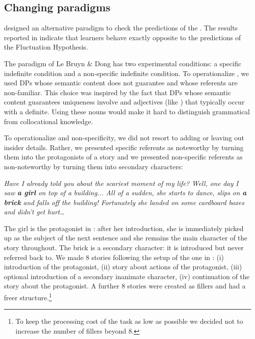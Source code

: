\documentclass[output=paper,
modfonts
]{langscibook}
\begin{document}
\subsection{Changing paradigms}

\citet{LeBruynDong2017S} designed an alternative paradigm to check the predictions of the . The results reported in \citet{LeBruynDong2017T} indicate that  learners behave exactly opposite to the predictions of the Fluctuation Hypothesis.

The paradigm of Le Bruyn \& Dong has two experimental conditions: a specific indefinite condition and a non-specific indefinite condition. To operationalize , we used DPs whose semantic content does not guarantee  and whose referents are non-familiar. This choice was inspired by the fact that DPs whose semantic content guarantees uniqueness involve  and adjectives (like ) that typically occur with a definite. Using these nouns would make it hard to distinguish grammatical from collocational knowledge.

To operationalize  and non-specificity, we did not resort to adding or leaving out insider details. Rather, we presented specific referents as noteworthy by turning them into the protagonists of a story and we presented non-specific referents as non-noteworthy by turning them into secondary characters:

\ea\label{ex:lebruyn:3}

\textit{Have I already told you about the scariest moment of my life? Well, one day I saw \textbf{a girl} on top of a building... All of a sudden, she starts to dance, slips on \textbf{a brick} and falls off the	building! Fortunately she landed on some cardboard boxes and didn’t get hurt…}

\z

The girl is the protagonist in : after her introduction, she is immediately picked up as the subject of the next sentence and she remains the main character of the story throughout. The brick is a secondary character: it is introduced but never referred back to. We made 8 stories following the setup of the one in : (i) introduction of the protagonist, (ii) story about actions of the protagonist, (iii) optional introduction of a secondary inanimate character, (iv) continuation of the story about the protagonist. A further 8 stories were created as fillers and had a freer structure.\footnote{To keep the processing cost of the task as low as possible we decided not to increase the number of fillers beyond 8.}
\end{document}
